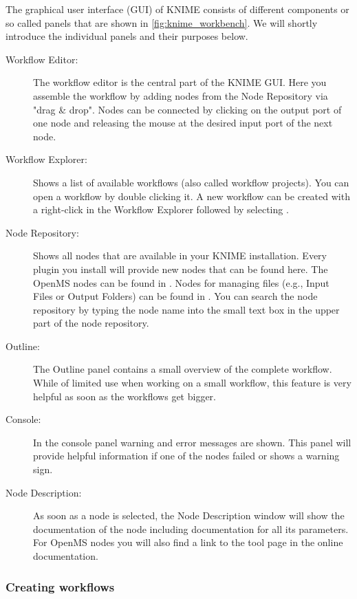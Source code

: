 The graphical user interface (GUI) of KNIME consists of different components or so called panels that are shown in \cref{fig:knime_workbench}.
We will shortly introduce the individual panels and their purposes below.

\begin{description}
\item[Workflow Editor:]
The workflow editor is the central part of the KNIME GUI.
Here you assemble the workflow by adding nodes from the Node Repository via "drag \& drop".
Nodes can be connected by clicking on the output port of one node and releasing the mouse at the desired input port of the next node.

\item[Workflow Explorer:]
Shows a list of available workflows (also called workflow projects).
You can open a workflow by double clicking it.
A new workflow can be created with a right-click in the Workflow Explorer followed by selecting .

\item[Node Repository:]
Shows all nodes that are available in your KNIME installation.
Every plugin you install will provide new nodes that can be found here.
The OpenMS nodes can be found in .
Nodes for managing files (e.g., Input Files or Output Folders) can be found in .
You can search the node repository by typing the node name into the small text box in the upper part of the node repository.

\item[Outline:]
The Outline panel contains a small overview of the complete workflow. While of limited use when working on a small workflow, this feature is very helpful as soon as the workflows get bigger.

\item[Console:]
In the console panel warning and error messages are shown.
This panel will provide helpful information if one of the nodes failed or shows a warning sign.

\item[Node Description:]
As soon as a node is selected, the Node Description window will show the documentation of the node including documentation for all its parameters.
For OpenMS nodes you will also find a link to the tool page in the online documentation.

\end{description}

\subsubsection{Creating workflows}
\label{sec:create_workflows}

